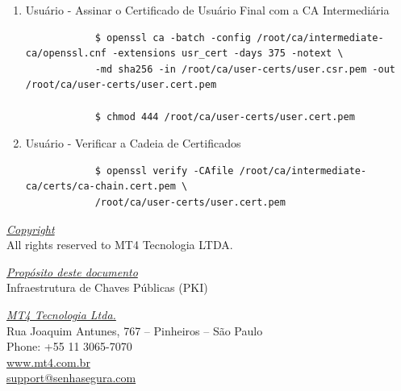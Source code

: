 \documentclass{article}
\begin{document}
\begin{enumerate}
	\item Usuário - Assinar o Certificado de Usuário Final com a CA Intermediária
	\begin{tcolorbox}[width=\textwidth]
	{\footnotesize
		\begin{verbatim}
			$ openssl ca -batch -config /root/ca/intermediate-ca/openssl.cnf -extensions usr_cert -days 375 -notext \
			-md sha256 -in /root/ca/user-certs/user.csr.pem -out /root/ca/user-certs/user.cert.pem

			$ chmod 444 /root/ca/user-certs/user.cert.pem
		\end{verbatim}
	}
	\end{tcolorbox}

	\item Usuário - Verificar a Cadeia de Certificados
	\begin{tcolorbox}[width=\textwidth]
	{\footnotesize
		\begin{verbatim}
			$ openssl verify -CAfile /root/ca/intermediate-ca/certs/ca-chain.cert.pem \
			/root/ca/user-certs/user.cert.pem
		\end{verbatim}
	}
	\end{tcolorbox}

\end{enumerate}

\pagebreak

\vspace*{\fill}
\begin{flushright}
	\underline{\textit{Copyright}}\\
	All rights reserved to MT4 Tecnologia LTDA.\bigskip

	\underline{\textit{Propósito deste documento}}\\
	Infraestrutura de Chaves Públicas (PKI)\bigskip
	
	\underline{\textit{MT4 Tecnologia Ltda.}}\\
	Rua Joaquim Antunes, 767 – Pinheiros – São Paulo\\
	Phone: +55 11 3065-7070\\
	\url{www.mt4.com.br}\\
	\href{mailto:support@senhasegura.com}{support@senhasegura.com}\\
\end{flushright}
\end{document}
